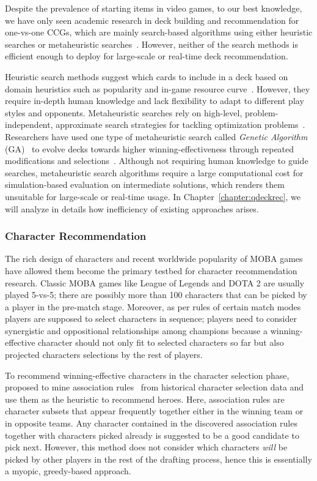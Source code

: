 Despite the prevalence of starting items in video games, to our best knowledge, we have only seen academic research in deck building and recommendation for one-vs-one CCGs, which are mainly search-based algorithms using either heuristic searches or metaheuristic searches~\cite{birattari2009tuning}. However, neither of the search methods is efficient enough to deploy for large-scale or real-time deck recommendation. 

Heuristic search methods suggest which cards to include in a deck based on domain heuristics such as popularity and in-game resource curve~\cite{frankkarsten,willfancher,stiegler2016hearthstone}. However, they require in-depth human knowledge and lack flexibility to adapt to different play styles and opponents. Metaheuristic searches rely on high-level, problem-independent, approximate search strategies for tackling optimization problems~\cite{birattari2009tuning}. Researchers have used one type of metaheuristic search called \textit{Genetic Algorithm} (GA)~\cite{holland1992adaptation} to evolve decks towards higher winning-effectiveness through repeated modifications and selections~\cite{garcia2016evolutionary,bjorke2017deckbuilding}. Although  not requiring human knowledge to guide searches, metaheuristic search algorithms require a large computational cost for simulation-based evaluation on intermediate solutions, which renders them unsuitable for large-scale or real-time usage. In Chapter~\ref{chapter:qdeckrec}, we will analyze in details how inefficiency of existing approaches arises. 

\subsubsection{Character Recommendation}
The rich design of characters and recent worldwide popularity of MOBA games have allowed them become the primary testbed for character recommendation research. Classic MOBA games like League of Legends and DOTA 2 are usually played 5-vs-5; there are possibly more than 100 characters that can be picked by a player in the pre-match stage. Moreover, as per rules of certain match modes players are supposed to select characters in sequence; players need to consider synergistic and oppositional relationships among champions because a winning-effective character should not only fit to selected characters so far but also projected characters selections by the rest of players. 

To recommend winning-effective characters in the character selection phase, \cite{hanke2017reco} proposed to mine association rules~\cite{agrawal1994fast} from historical character selection data and use them as the heuristic to recommend heroes. Here, association rules are character subsets that appear frequently together either in the winning team or in opposite teams. Any character contained in the discovered association rules together with characters picked already is suggested to be a good candidate to pick next. However, this method does not consider which characters \textit{will} be picked  by other players in the rest of the drafting process, hence this is essentially a myopic, greedy-based approach.


